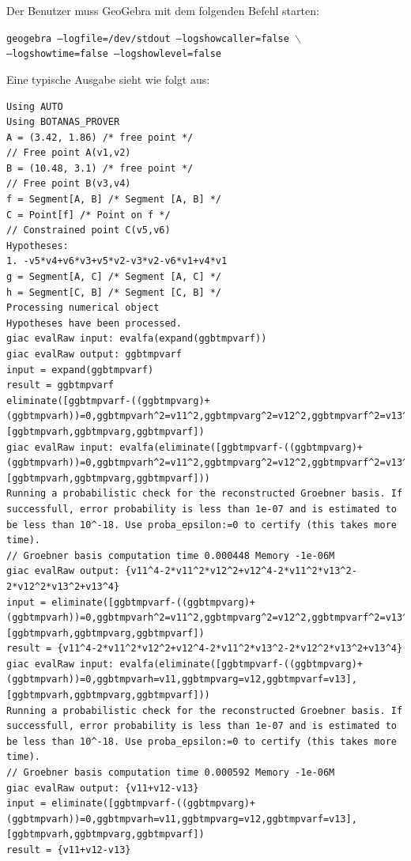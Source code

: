 \documentclass{article}
\begin{document}
Der Benutzer muss GeoGebra mit dem folgenden Befehl starten:
{
    \begin{center}
        \texttt{geogebra --logfile=/dev/stdout --logshowcaller=false $\backslash$\\ --logshowtime=false --logshowlevel=false} 
    \end{center}
} %
Eine typische Ausgabe sieht wie folgt aus:
{
\scriptsize
\begin{lstlisting}[language=mylog]
Using AUTO
Using BOTANAS_PROVER
A = (3.42, 1.86) /* free point */
// Free point A(v1,v2)
B = (10.48, 3.1) /* free point */
// Free point B(v3,v4)
f = Segment[A, B] /* Segment [A, B] */
C = Point[f] /* Point on f */
// Constrained point C(v5,v6)
Hypotheses:
1. -v5*v4+v6*v3+v5*v2-v3*v2-v6*v1+v4*v1
g = Segment[A, C] /* Segment [A, C] */
h = Segment[C, B] /* Segment [C, B] */
Processing numerical object
Hypotheses have been processed.
giac evalRaw input: evalfa(expand(ggbtmpvarf))
giac evalRaw output: ggbtmpvarf
input = expand(ggbtmpvarf)
result = ggbtmpvarf
eliminate([ggbtmpvarf-((ggbtmpvarg)+(ggbtmpvarh))=0,ggbtmpvarh^2=v11^2,ggbtmpvarg^2=v12^2,ggbtmpvarf^2=v13^2],[ggbtmpvarh,ggbtmpvarg,ggbtmpvarf])
giac evalRaw input: evalfa(eliminate([ggbtmpvarf-((ggbtmpvarg)+(ggbtmpvarh))=0,ggbtmpvarh^2=v11^2,ggbtmpvarg^2=v12^2,ggbtmpvarf^2=v13^2],[ggbtmpvarh,ggbtmpvarg,ggbtmpvarf]))
Running a probabilistic check for the reconstructed Groebner basis. If successfull, error probability is less than 1e-07 and is estimated to be less than 10^-18. Use proba_epsilon:=0 to certify (this takes more time).
// Groebner basis computation time 0.000448 Memory -1e-06M
giac evalRaw output: {v11^4-2*v11^2*v12^2+v12^4-2*v11^2*v13^2-2*v12^2*v13^2+v13^4}
input = eliminate([ggbtmpvarf-((ggbtmpvarg)+(ggbtmpvarh))=0,ggbtmpvarh^2=v11^2,ggbtmpvarg^2=v12^2,ggbtmpvarf^2=v13^2],[ggbtmpvarh,ggbtmpvarg,ggbtmpvarf])
result = {v11^4-2*v11^2*v12^2+v12^4-2*v11^2*v13^2-2*v12^2*v13^2+v13^4}
giac evalRaw input: evalfa(eliminate([ggbtmpvarf-((ggbtmpvarg)+(ggbtmpvarh))=0,ggbtmpvarh=v11,ggbtmpvarg=v12,ggbtmpvarf=v13],[ggbtmpvarh,ggbtmpvarg,ggbtmpvarf]))
Running a probabilistic check for the reconstructed Groebner basis. If successfull, error probability is less than 1e-07 and is estimated to be less than 10^-18. Use proba_epsilon:=0 to certify (this takes more time).
// Groebner basis computation time 0.000592 Memory -1e-06M
giac evalRaw output: {v11+v12-v13}
input = eliminate([ggbtmpvarf-((ggbtmpvarg)+(ggbtmpvarh))=0,ggbtmpvarh=v11,ggbtmpvarg=v12,ggbtmpvarf=v13],[ggbtmpvarh,ggbtmpvarg,ggbtmpvarf])
result = {v11+v12-v13}

\end{lstlisting}}
\end{document}
